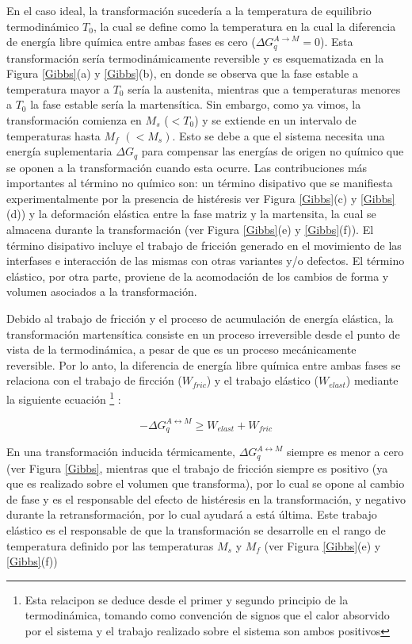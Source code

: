 \documentclass[12pt]{article}
\theoremstyle{definition}
\theoremstyle{remark}
\begin{document}
En el caso ideal, la transformación sucedería a la temperatura de equilibrio termodinámico $T_0$, la cual se define como la temperatura en la cual la diferencia de energía libre química entre ambas fases es cero ($\Delta G^{A \rightarrow M}_q = 0$). Esta transformación sería termodinámicamente reversible y es esquematizada en la Figura \ref{Gibbs}(a) y \ref{Gibbs}(b), en donde se observa que la fase estable a temperatura mayor a $T_0$ sería la austenita, mientras que a temperaturas menores a $T_0$ la fase estable sería la martensítica. Sin embargo, como ya vimos, la transformación comienza en $M_s$  ($< T_0$) y se extiende en un intervalo de temperaturas hasta $M_f$  $(< M_s)$. Esto se debe a que el sistema necesita una energía suplementaria $\Delta G_q$ para compensar las energías de origen no químico que se oponen a la transformación cuando esta ocurre. Las contribuciones más importantes al término no químico son: un término disipativo que se manifiesta experimentalmente por la presencia de histéresis ver Figura \ref{Gibbs}(c) y \ref{Gibbs}(d)) y la deformación elástica entre la fase matriz y la martensita, la cual se almacena durante la transformación (ver Figura \ref{Gibbs}(e) y \ref{Gibbs}(f)). El término disipativo incluye el trabajo de fricción generado en el movimiento de las interfases e interacción de las mismas con otras variantes y/o defectos. El término elástico, por otra parte, proviene de la acomodación de los cambios de forma y volumen asociados a la transformación\cite{Wollants1993}.

Debido al trabajo de fricción y el proceso de acumulación de energía elástica, la
transformación martensítica consiste en un proceso irreversible desde el punto de vista de la termodinámica, a pesar de que es un proceso mecánicamente reversible. Por lo anto, la diferencia de energía libre química entre ambas fases se relaciona con el trabajo de fircción ($W_{fric}$) y el trabajo elástico ($W_{elast}$) mediante la siguiente ecuación \footnote{Esta relacipon se deduce desde el primer y segundo principio de la termodinámica, tomando como convención de signos que el calor absorvido por el sistema y el trabajo realizado sobre el sistema son ambos positivos} \cite{Isola2020}:

\begin{equation}
	- \Delta G_{q}^{A \leftrightarrow M} \geq W_{elast} + W_{fric}
\end{equation}

En una transformación inducida térmicamente, $\Delta G_{q}^{A \leftrightarrow M}$ siempre es menor a cero (ver Figura \ref{Gibbs}, mientras que el trabajo de fricción siempre es positivo (ya que es realizado sobre el volumen que transforma), por lo cual se opone al cambio de fase y es el responsable del efecto de histéresis en la transformación, y negativo durante la retransformación, por lo cual ayudará a está última. Este trabajo elástico es el responsable de que la transformación se desarrolle en el rango de temperatura definido por las temperaturas $M_s$ y $M_f$ (ver Figura \ref{Gibbs}(e) y \ref{Gibbs}(f)) 
\end{document}
